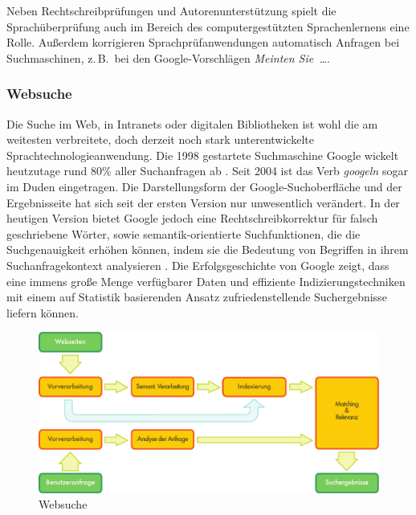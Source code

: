 \documentclass[]{../../metanetpaper}
\begin{document}
\begin{multicols}{2}

Neben Rechtschreibprüfungen und Autorenunterstützung spielt die Sprachüberprüfung auch im Bereich des computergestützten Sprachenlernens eine Rolle. Außerdem korrigieren Sprachprüfanwendungen automatisch Anfragen bei Suchmaschinen, z.\,B.~bei den Google-Vor\-schlägen \textit{Meinten Sie~\dots}.

\subsubsection{Websuche}

Die Suche im Web, in Intranets oder digitalen Bibliotheken ist wohl die am weitesten verbreitete, doch derzeit noch stark unterentwickelte Sprachtechnologieanwendung. Die 1998 gestartete Suchmaschine Google wickelt heutzutage rund 80\% aller Suchanfragen ab \cite{spi1}. Seit 2004 ist das Verb \textit{googeln} sogar im Duden eingetragen. Die Darstellungsform der Google-Such\-ober\-fläche und der Ergebnisseite hat sich seit der ersten Version nur unwesentlich verändert. In der heutigen Version bietet Google jedoch eine Rechtschreibkorrektur für falsch geschriebene Wörter, sowie se\-man\-tik-orien\-tier\-te Suchfunktionen, die die Suchgenauigkeit erhöhen können, indem sie die Bedeutung von Begriffen in ihrem Suchanfragekontext analysieren \cite{pc1}. Die Erfolgsgeschichte von Google zeigt, dass eine immens große Menge verfügbarer Daten und effiziente Indizierungstechniken mit einem auf Statistik basierenden Ansatz zufriedenstellende Suchergebnisse liefern können.

\begin{figure}[htb]
  \vspace{-9mm}
  \center
  \includegraphics[width=\textwidth]{../_media/german/web_search_architecture}
  \vspace{-5mm}
  \caption{Websuche}
  \label{fig:websearcharch_de}
\end{figure}


\end{multicols}
\end{document}
